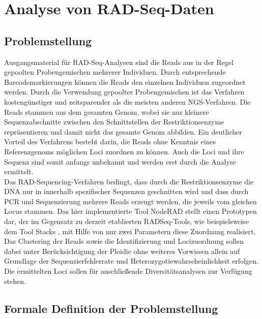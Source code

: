 \chapter{Analyse von RAD-Seq-Daten} \label{chapter:kap2}
\section{Problemstellung} \label{sec:probl}

Ausgangsmaterial für RAD-Seq-Analysen sind die Reads aus in der Regel gepoolten Probengemischen mehrerer Individuen. Durch entsprechende Barcodemarkierungen können die Reads den einzelnen Individuen zugeordnet werden. Durch die Verwendung gepoolter Probengemischen ist das Verfahren kostengünstiger und zeitsparender als die meisten anderen NGS-Verfahren. Die Reads stammen aus dem gesamten Genom, wobei sie nur kleinere Sequenzabschnitte zwischen den Schnittstellen der Restriktionsenzyme repräsentieren und damit nicht das gesamte Genom abbilden. Ein deutlicher Vorteil des Verfahrens besteht darin, die Reads ohne Kenntnis eines Referenzgenoms möglichen Loci zuordnen zu können. Auch die Loci und ihre Sequenz sind somit anfangs unbekannt und werden erst durch die Analyse ermittelt.\\

Das RAD-Sequencing-Verfahren bedingt, dass durch die Restriktionsenzyme die DNA nur in innerhalb spezifischer Sequenzen geschnitten wird und dass durch PCR und Sequenzierung mehrere Reads erzeugt werden, die jeweils vom gleichen Locus stammen. Das hier implementierte Tool NodeRAD stellt einen Prototypen dar, der im Gegensatz zu derzeit etablierten RADSeq-Tools, wie beispielsweise dem Tool Stacks \cite{catchen_2013}, mit Hilfe von nur zwei Parametern diese Zuordnung realisiert. Das Clustering der Reads sowie die Identifizierung und Locizuordnung sollen dabei unter Berücksichtigung der Ploidie ohne weiteres Vorwissen allein auf Grundlage der Sequenzierfehlerrate und Heterozygotiewahrscheinlichkeit erfolgen. Die ermittelten Loci sollen für anschließende Diversitätsanalysen zur Verfügung stehen. 

\section{Formale Definition der Problemstellung} \label{sec:formal}

